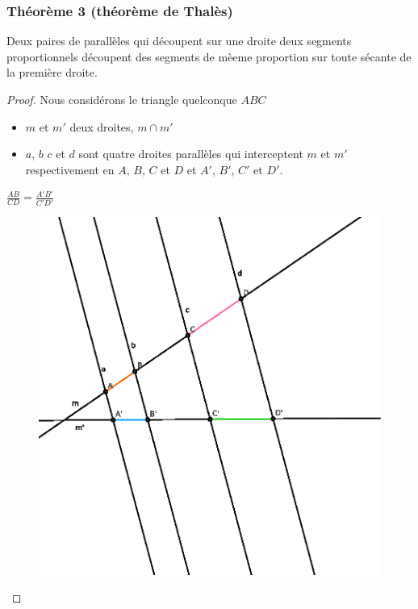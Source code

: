 \documentclass[a4paper,12pt]{article}
\begin{document}
\pagebreak
\subsubsection{Théorème 3 (théorème de Thalès)}
\begin{theorem}
Deux paires de parallèles qui découpent sur une droite deux segments proportionnels découpent des segments de mèeme proportion sur toute sécante de la première droite.
\end{theorem}

\begin{proof}
Nous considérons le triangle quelconque $ABC$ 
\begin{hyp}

\begin{itemize}
    \item $m$ et $m'$ deux droites, $m \cap m'$
    \item $a$, $b$ $c$ et $d$ sont quatre droites parallèles qui interceptent $m$ et $m'$ respectivement en $A$, $B$, $C$ et $D$ et $A'$, $B'$, $C'$ et $D'$.
\end{itemize}

\end{hyp}

\begin{concl}
$\frac{AB}{CD} = \frac{A'B'}{C'D'}$
\end{concl}
\begin{figure}[H]
        \centering
        \includegraphics[scale=1.2]{thales1.eps}
    \end{figure}


\end{proof}
\end{document}
